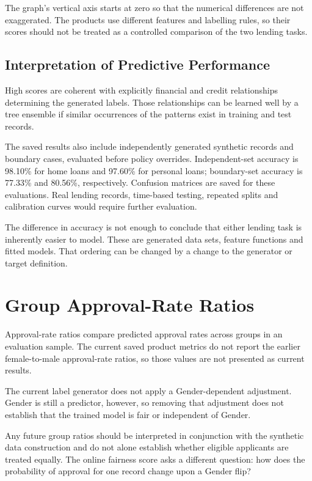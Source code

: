The graph's vertical axis starts at zero so that the numerical differences are not exaggerated. The products use different features and labelling rules, so their scores should not be treated as a controlled comparison of the two lending tasks.

\subsection{Interpretation of Predictive Performance}
High scores are coherent with explicitly financial and credit relationships determining the generated labels. Those relationships can be learned well by a tree ensemble if similar occurrences of the patterns exist in training and test records.

The saved results also include independently generated synthetic records and boundary cases, evaluated before policy overrides. Independent-set accuracy is 98.10\% for home loans and 97.60\% for personal loans; boundary-set accuracy is 77.33\% and 80.56\%, respectively. Confusion matrices are saved for these evaluations. Real lending records, time-based testing, repeated splits and calibration curves would require further evaluation.

The difference in accuracy is not enough to conclude that either lending task is inherently easier to model. These are generated data sets, feature functions and fitted models. That ordering can be changed by a change to the generator or target definition.

\section{Group Approval-Rate Ratios}
Approval-rate ratios compare predicted approval rates across groups in an evaluation sample. The current saved product metrics do not report the earlier female-to-male approval-rate ratios, so those values are not presented as current results.

The current label generator does not apply a Gender-dependent adjustment. Gender is still a predictor, however, so removing that adjustment does not establish that the trained model is fair or independent of Gender.

Any future group ratios should be interpreted in conjunction with the synthetic data construction and do not alone establish whether eligible applicants are treated equally. The online fairness score asks a different question: how does the probability of approval for one record change upon a Gender flip?

